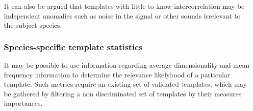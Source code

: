 It can also be argued that templates with little to know intercorrelation may be
independent anomalies such as noise in the signal or other sounds irrelevant to
the subject species.

\subsubsection{Species-specific template statistics}
It may be possible to use information regarding average dimensionality and mean
frequency information to determine the relevance likelyhood of a particular template.
Such metrics require an existing set of validated templates, which may be gathered
by filtering a non discriminated set of templates by their measures importances.

